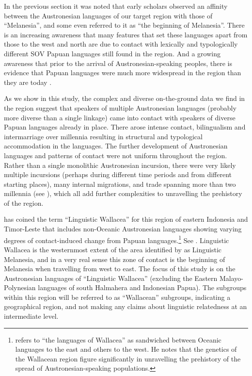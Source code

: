 In the previous section it was noted that early scholars observed an affinity
between the Austronesian languages of our target region with those of “Melanesia”,
and some even referred to it as “the beginning of Melanesia”.
There is an increasing awareness that many features that set these languages apart from those to the west
and north are due to contact with lexically
and typologically different SOV Papuan languages still found in the region.
And a growing awareness that prior to the arrival of Austronesian-speaking peoples,
there is evidence that Papuan languages were much
more widespread in the region than they are today
\citep{Grimes1991a,Grimes2000a,GrimesCIP,GrimesTherikGrimesJacob1997,
KlamerReesinkVanStaden2008,DonohueGrimes2008,Schapper2015,Schapper2024,Klamer2019}.

As we show in this study,
the complex and diverse on-the-ground data we find in the region suggest
that speakers of multiple Austronesian languages
(probably more diverse than a single linkage)
came into contact with speakers of diverse Papuan languages already in place.
There arose intense contact, bilingualism
and intermarriage over millennia resulting in structural
and typological accommodation in the languages.
The further development of Austronesian languages
and patterns of contact were not uniform throughout the region.
Rather than a single monolithic Austronesian incursion,
there were very likely multiple incursions (perhaps during different time periods
and from different starting places),
many internal migrations,
and trade spanning more than two millennia (see ),
which all add further complexities to unravelling the prehistory of the region.

\citet{Schapper2015} has coined the term ``Linguistic Wallacea''
for this region of eastern Indonesia
and Timor-Leste that includes non-Oceanic Austronesian languages
showing varying degrees of contact-induced change from Papuan languages.\footnote{
		\citet[59]{Oppenheimer2003} refers to “the languages of Wallacea”
		as sandwiched between Oceanic languages to the east and others to the west.
		He notes that the genetics of the Wallacean region figure significantly
		in unravelling the prehistory of the spread of Austronesian-speaking populations.}
See .
Linguistic Wallacea is the westernmost extent of the area identified by \citet{Schapper2015}
as Linguistic Melanesia, and in a very real sense this
zone of contact is the beginning of Melanesia when travelling from west to east.
The focus of this study is on the Austronesian languages of “Linguistic Wallacea”
(excluding the Eastern Malayo-Polynesian languages of south Halmahera and Indonesian Papua).
The subgroups within this region will be referred to as “Wallacean” subgroups,
indicating a geographical region,
and not making any claims about linguistic relatedness at an intermediate level.

